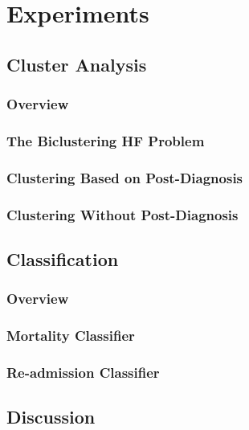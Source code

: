 \documentclass[../thesis.tex]{subfiles}
\begin{document}
\chapter{Experiments}
\label{chap:exp}

\section{Cluster Analysis}

\subsection{Overview}

\subsection{The Biclustering HF Problem}

\subsection{Clustering Based on Post-Diagnosis}

\subsection{Clustering Without Post-Diagnosis}

\section{Classification}

\subsection{Overview}

\subsection{Mortality Classifier}

\subsection{Re-admission Classifier}

\section{Discussion}
\end{document}
